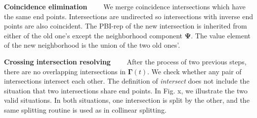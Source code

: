\documentclass[10pt,journal,compsoc]{IEEEtran}
\begin{document}
\vspace{0.5em}
\noindent \textbf{Coincidence elimination}~~~~
We merge coincidence intersections which have the same end points. Intersections are undirected so intersections with inverse end points are also coincident. The PBI-rep of the new intersection is inherited from either of the old one's except the neighborhood component $\bm{\Psi}$. The value element of the new neighborhood is the union of the two old ones'.

\vspace{0.5em}
\noindent \textbf{Crossing intersection resolving}~~~~
After the process of two previous steps, there are no overlapping intersections in $\bm{\Gamma}(t)$. We check whether any pair of intersections intersect each other. The definition of \emph{intersect} does not include the situation that two intersections share end points. In Fig. x, we illustrate the two valid situations. In both situations, one intersection is split by the other, and the same splitting routine is used as in collinear splitting.

\end{document}
